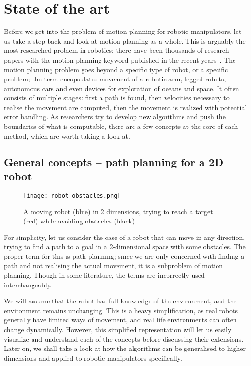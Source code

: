 \chapter{State of the art}\label{SotA}

Before we get into the problem of motion planning for robotic manipulators, let us take a step back and look at motion planning as a whole. This is arguably the most researched problem in robotics; there have been thousands of research papers with the motion planning keyword published in the recent years~\cite{RASreview}. The motion planning problem goes beyond a specific type of robot, or a specific problem; the term encapsulates movement of a robotic arm, legged robots, autonomous cars and even devices for exploration of oceans and space. It often consists of multiple stages: first a path is found, then velocities necessary to realise the movement are computed, then the movement is realized with potential error handling.
As researchers try to develop new algorithms and push the boundaries of what is computable, there are a few concepts at the core of each method, which are worth taking a look at.

\section{General concepts -- path planning for a 2D robot}

\begin{wrapfigure}{r}{0.33\textwidth}
    \centering
    \texttt{[image: robot\_obstacles.png]}
  \caption{A moving robot (blue) in 2 dimensions, trying to reach a target (red) while avoiding obstacles (black).}\label{fig:bot}
\end{wrapfigure}

For simplicity, let us consider the case of a robot that can move in any direction, trying to find a path to a goal in a 2-dimensional space with some obstacles. The proper term for this is path planning; since we are only concerned with finding a path and not realising the actual movement, it is a subproblem of motion planning. Though in some literature, the terms are incorrectly used interchangeably.

We will assume that the robot has full knowledge of the environment, and the environment remains unchanging. This is a heavy simplification, as real robots generally have limited ways of movement, and real life environments can often change dynamically. However, this simplified representation will let us easily visualize and understand each of the concepts before discussing their extensions. Later on, we shall take a look at how the algorithms can be generalised to higher dimensions and applied to robotic manipulators specifically.

